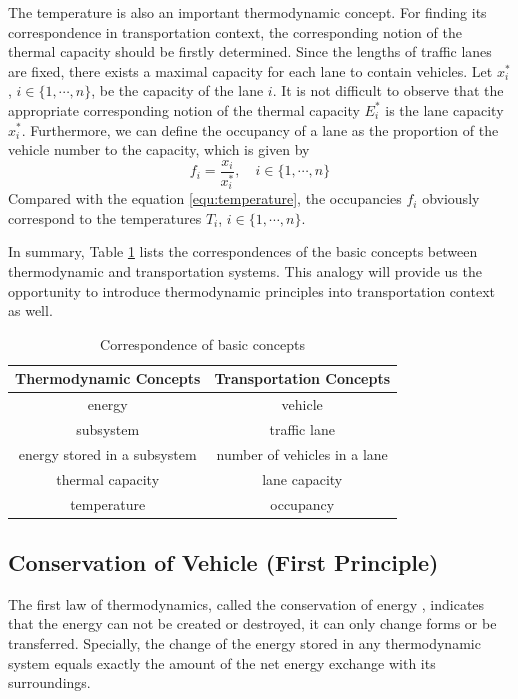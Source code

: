 \documentclass[preprint,authoryear,12pt]{elsarticle}
\begin{document}
The temperature is also an important thermodynamic concept. For
finding its correspondence in transportation context, the
corresponding notion of the thermal capacity should be firstly
determined. Since the lengths of traffic lanes are fixed, there
exists a maximal capacity for each lane to contain vehicles. Let
$x_i^*$, $i\in\{1,\cdots,n\}$, be the capacity of the lane $i$. It is
not difficult to observe that the appropriate corresponding notion of
the thermal capacity $E_i^*$ is the lane capacity $x_i^*$.
Furthermore, we can define the occupancy of a lane as the proportion
of the vehicle number to the capacity, which is given by
\begin{equation}\label{equ:occupancy}
f_i = \frac{x_i}{x_i^*},\quad i\in\{1,\cdots,n\}
\end{equation}
Compared with the equation \eqref{equ:temperature}, the occupancies
$f_i$ obviously correspond to the temperatures $T_i$,
$i\in\{1,\cdots,n\}$.

In summary, Table \ref{tab:notions} lists the correspondences of the
basic concepts between thermodynamic and transportation systems. This
analogy will provide us the opportunity to introduce thermodynamic
principles into transportation context as well.

\begin{table}[ht]
\centering \caption{Correspondence of basic concepts}
\label{tab:notions}
\begin{tabular}{cc}
  \hline
  Thermodynamic Concepts & Transportation Concepts \\
  \hline
  energy & vehicle \\
  subsystem & traffic lane \\
  energy stored in a subsystem & number of vehicles in a lane \\
  thermal capacity & lane capacity \\
  temperature & occupancy \\
  \hline
\end{tabular}
\end{table}

\subsection{Conservation of Vehicle (First Principle)}

The first law of thermodynamics, called the conservation of energy
\citep{cengel_thermodynamics:_2001}, indicates that the energy can
not be created or destroyed, it can only change forms or be
transferred. Specially, the change of the energy stored in any
thermodynamic system equals exactly the amount of the net energy
exchange with its surroundings.
\end{document}
